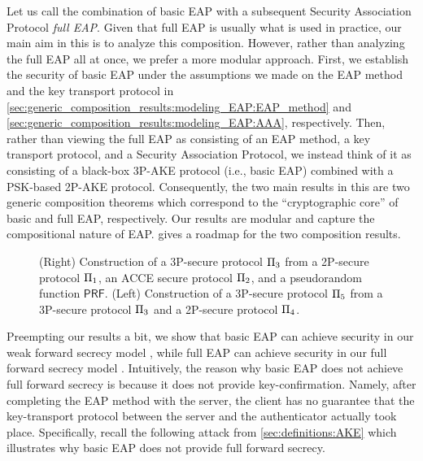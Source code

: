 Let us call the combination of basic EAP with a subsequent Security Association Protocol \emph{full EAP}.
Given that full EAP is usually what is used in practice,
our main aim in this  is to analyze this composition. 
However,
rather than analyzing the full EAP all at once,
we prefer a more modular approach.
First, we establish the security of basic EAP under the assumptions we made on the EAP method and the key transport protocol in \cref{sec:generic_composition_results:modeling_EAP:EAP_method} and \cref{sec:generic_composition_results:modeling_EAP:AAA}, respectively.
Then,
rather than viewing the full EAP as consisting of an EAP method,
a  key transport protocol, and a Security Association Protocol,
we instead think of it as consisting of a black-box 3P-AKE protocol
(i.e., basic EAP) combined with a PSK-based 2P-AKE protocol. 
Consequently,
the two main results in this  are two generic composition theorems which correspond to the ``cryptographic core'' of basic and full EAP, respectively. 
Our results are modular and capture the compositional nature of EAP.
 gives a roadmap for the two composition results.
 
\begin{figure}
	\centering
	
	
	\caption{(Right) Construction of a 3P-\akewfstext secure protocol $\mathrm{\Pi}_3$ from a 2P-\akefstext secure protocol $\mathrm{\Pi}_1$, 
	an ACCE secure protocol $\mathrm{\Pi}_2$, and a pseudorandom function $\mathsf{PRF}$.
	(Left) Construction of a 3P-\akefstext secure protocol $\mathrm{\Pi}_5$ from a 3P-\akewfstext secure protocol $\mathrm{\Pi}_3$ and a
	2P-\akenfstext secure protocol $\mathrm{\Pi}_4$.
	}
	\label{fig:generic_protocol}
\end{figure}

Preempting our results a bit,
we show that basic EAP can achieve security in our weak forward secrecy model \akewfstext,
while full EAP can achieve security in our full forward secrecy model \akefstext.
Intuitively,
the reason why basic EAP does not achieve full forward secrecy is because it does not provide key-confirmation.
Namely,
after completing the EAP method with the server,
the client has no guarantee that the key-transport protocol between the server and the authenticator actually took place.
Specifically,
recall the following attack from \cref{sec:definitions:AKE}
which illustrates why basic EAP does not provide full forward secrecy. 


